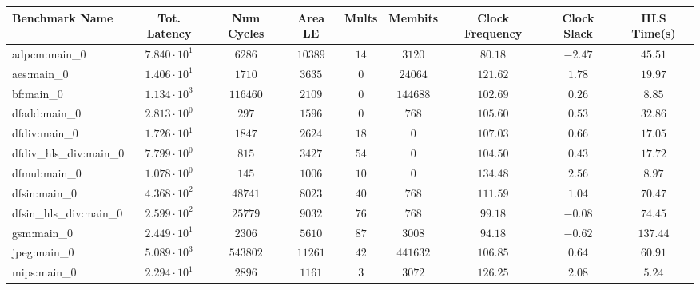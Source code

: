 \begin{tabular}{|l|c|c|c|c|c|c|c|c|}
\hline
Benchmark Name          & Tot. Latency           & Num Cycles & Area LE   & Mults   & Membits    & Clock Frequency & Clock Slack & HLS Time(s) \\
\hline
adpcm:main\_0           & $ 7.840 \cdot 10^{1} $ & $ 6286   $ & $ 10389 $ & $ 14  $ & $ 3120   $ & $ 80.18       $ & $ -2.47   $ & $ 45.51   $ \\
aes:main\_0             & $ 1.406 \cdot 10^{1} $ & $ 1710   $ & $ 3635  $ & $ 0   $ & $ 24064  $ & $ 121.62      $ & $ 1.78    $ & $ 19.97   $ \\
bf:main\_0              & $ 1.134 \cdot 10^{3} $ & $ 116460 $ & $ 2109  $ & $ 0   $ & $ 144688 $ & $ 102.69      $ & $ 0.26    $ & $ 8.85    $ \\
dfadd:main\_0           & $ 2.813 \cdot 10^{0} $ & $ 297    $ & $ 1596  $ & $ 0   $ & $ 768    $ & $ 105.60      $ & $ 0.53    $ & $ 32.86   $ \\
dfdiv:main\_0           & $ 1.726 \cdot 10^{1} $ & $ 1847   $ & $ 2624  $ & $ 18  $ & $ 0      $ & $ 107.03      $ & $ 0.66    $ & $ 17.05   $ \\
dfdiv\_hls\_div:main\_0 & $ 7.799 \cdot 10^{0} $ & $ 815    $ & $ 3427  $ & $ 54  $ & $ 0      $ & $ 104.50      $ & $ 0.43    $ & $ 17.72   $ \\
dfmul:main\_0           & $ 1.078 \cdot 10^{0} $ & $ 145    $ & $ 1006  $ & $ 10  $ & $ 0      $ & $ 134.48      $ & $ 2.56    $ & $ 8.97    $ \\
dfsin:main\_0           & $ 4.368 \cdot 10^{2} $ & $ 48741  $ & $ 8023  $ & $ 40  $ & $ 768    $ & $ 111.59      $ & $ 1.04    $ & $ 70.47   $ \\
dfsin\_hls\_div:main\_0 & $ 2.599 \cdot 10^{2} $ & $ 25779  $ & $ 9032  $ & $ 76  $ & $ 768    $ & $ 99.18       $ & $ -0.08   $ & $ 74.45   $ \\
gsm:main\_0             & $ 2.449 \cdot 10^{1} $ & $ 2306   $ & $ 5610  $ & $ 87  $ & $ 3008   $ & $ 94.18       $ & $ -0.62   $ & $ 137.44  $ \\
jpeg:main\_0            & $ 5.089 \cdot 10^{3} $ & $ 543802 $ & $ 11261 $ & $ 42  $ & $ 441632 $ & $ 106.85      $ & $ 0.64    $ & $ 60.91   $ \\
mips:main\_0            & $ 2.294 \cdot 10^{1} $ & $ 2896   $ & $ 1161  $ & $ 3   $ & $ 3072   $ & $ 126.25      $ & $ 2.08    $ & $ 5.24    $ \\

\end{tabular}
